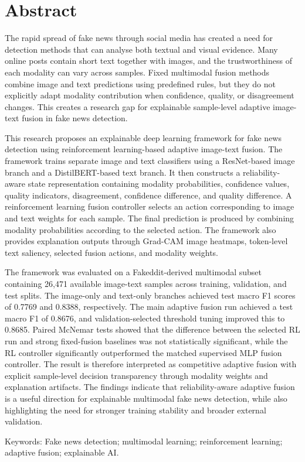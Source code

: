 \section*{Abstract}


The rapid spread of fake news through social media has created a need for detection methods that can analyse both textual and visual evidence. Many online posts contain short text together with images, and the trustworthiness of each modality can vary across samples. Fixed multimodal fusion methods combine image and text predictions using predefined rules, but they do not explicitly adapt modality contribution when confidence, quality, or disagreement changes. This creates a research gap for explainable sample-level adaptive image-text fusion in fake news detection.


This research proposes an explainable deep learning framework for fake news detection using reinforcement learning-based adaptive image-text fusion. The framework trains separate image and text classifiers using a ResNet-based image branch and a DistilBERT-based text branch. It then constructs a reliability-aware state representation containing modality probabilities, confidence values, quality indicators, disagreement, confidence difference, and quality difference. A reinforcement learning fusion controller selects an action corresponding to image and text weights for each sample. The final prediction is produced by combining modality probabilities according to the selected action. The framework also provides explanation outputs through Grad-CAM image heatmaps, token-level text saliency, selected fusion actions, and modality weights.


The framework was evaluated on a Fakeddit-derived multimodal subset containing 26,471 available image-text samples across training, validation, and test splits. The image-only and text-only branches achieved test macro F1 scores of 0.7769 and 0.8388, respectively. The main adaptive fusion run achieved a test macro F1 of 0.8676, and validation-selected threshold tuning improved this to 0.8685. Paired McNemar tests showed that the difference between the selected RL run and strong fixed-fusion baselines was not statistically significant, while the RL controller significantly outperformed the matched supervised MLP fusion controller. The result is therefore interpreted as competitive adaptive fusion with explicit sample-level decision transparency through modality weights and explanation artifacts. The findings indicate that reliability-aware adaptive fusion is a useful direction for explainable multimodal fake news detection, while also highlighting the need for stronger training stability and broader external validation.


Keywords: Fake news detection; multimodal learning; reinforcement learning; adaptive fusion; explainable AI.
